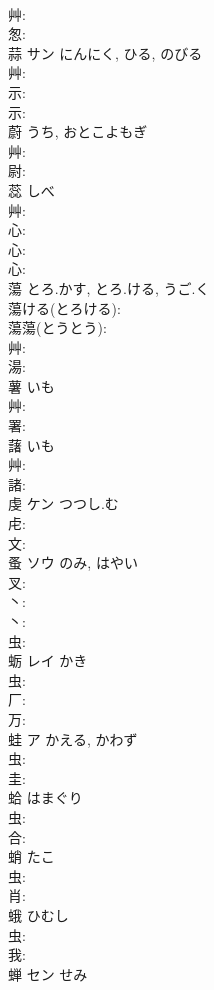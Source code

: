 \documentclass[8pt]{extreport}
\begin{document}
\begin{CJK}{UTF8}{min}
\\	艸: 
\\	怱: 
\\	蒜	サン	にんにく, ひる, のびる		
\\	艸: 
\\	示: 
\\	示: 
\\	蔚		うち, おとこよもぎ			
\\	艸: 
\\	尉: 
\\	蕊		しべ			
\\	艸: 
\\	心: 
\\	心: 
\\	心: 
\\	蕩		とろ.かす, とろ.ける, うご.く			
\\	蕩ける(とろける): 
\\	蕩蕩(とうとう): 
\\	艸: 
\\	湯: 
\\	薯		いも			
\\	艸: 
\\	署: 
\\	藷		いも			
\\	艸: 
\\	諸: 
\\	虔	ケン	つつし.む		
\\	虍: 
\\	文: 
\\	蚤	ソウ	のみ, はやい		
\\	叉: 
\\	丶: 
\\	丶: 
\\	虫: 
\\	蛎	レイ	かき		
\\	虫: 
\\	厂: 
\\	万: 
\\	蛙	ア	かえる, かわず		
\\	虫: 
\\	圭: 
\\	蛤		はまぐり			
\\	虫: 
\\	合: 
\\	蛸		たこ			
\\	虫: 
\\	肖: 
\\	蛾		ひむし			
\\	虫: 
\\	我: 
\\	蝉	セン	せみ		

\end{CJK}
\end{document}
